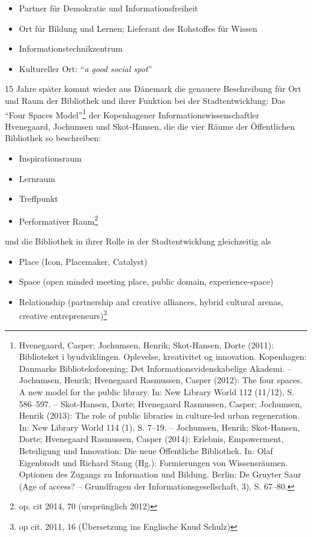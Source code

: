 \begin{itemize}
\item
  Partner für Demokratie und Informationsfreiheit
\item
  Ort für Bildung und Lernen; Lieferant des Rohstoffes für Wissen
\item
  Informationstechnikzentrum
\item
  Kultureller Ort: \enquote{\emph{a good social spot}}
\end{itemize}

15 Jahre später kommt wieder aus Dänemark die genauere Beschreibung für
Ort und Raum der Bibliothek und ihrer Funktion bei der Stadtentwicklung:
Das \enquote{Four Spaces Model}\footnote{Hvenegaard, Casper; Jochumsen,
  Henrik; Skot-Hansen, Dorte (2011): Biblioteket i byudviklingen.
  Oplevelse, kreativitet og innovation. Kopenhagen: Danmarks
  Biblioteksforening; Det Informationsvidenskabelige Akademi. --
  Jochumsen, Henrik; Hvenegaard Rasmussen, Casper (2012): The four
  spaces. A new model for the public library. In: New Library World 112
  (11/12), S. 586--597. -- Skot-Hansen, Dorte; Hvenegaard Rasmussen,
  Casper; Jochumsen, Henrik (2013): The role of public libraries in
  culture-led urban regeneration. In: New Library World 114 (1), S.
  7--19. -- Jochumsen, Henrik; Skot-Hansen, Dorte; Hvenegaard Rasmussen,
  Casper (2014): Erlebnis, Empowerment, Beteiligung und Innovation: Die
  neue Öffentliche Bibliothek. In: Olaf Eigenbrodt und Richard Stang
  (Hg.): Formierungen von Wissensräumen. Optionen des Zugangs zu
  Information und Bildung. Berlin: De Gruyter Saur (Age of access? --
  Grundfragen der Informationsgesellschaft, 3), S. 67--80.} der
Kopenhagener Informationswissenschaftler Hvenegaard, Jochumsen und
Skot-Hansen, die die vier Räume der Öffentlichen Bibliothek so
beschreiben:

\begin{itemize}
\item
  Inspirationsraum
\item
  Lernraum
\item
  Treffpunkt
\item
  Performativer Raum\footnote{op. cit 2014, 70 (ursprünglich 2012)}
\end{itemize}

und die Bibliothek in ihrer Rolle in der Stadtentwicklung gleichzeitig
als

\begin{itemize}
\item
  Place (Icon, Placemaker, Catalyst)
\item
  Space (open minded meeting place, public domain, experience-space)
\item
  Relationship (partnership and creative alliances, hybrid cultural
  arenas, creative entrepreneurs)\footnote{op cit. 2011, 16 (Übersetzung
    ins Englische Knud Schulz)}
\end{itemize}

